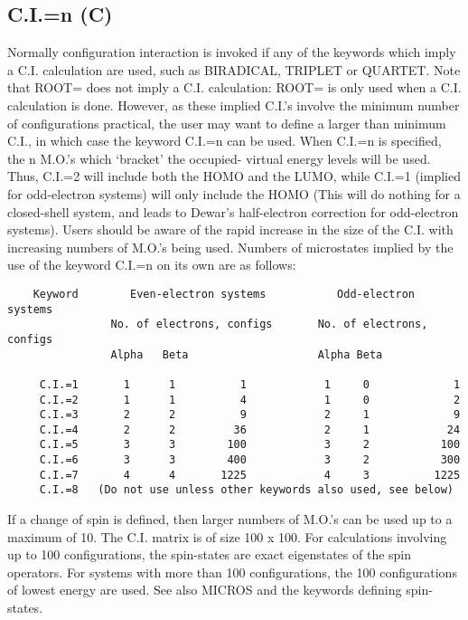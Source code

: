 \documentclass[a4paper]{book}
\newcommand{\mi}[1]{#1\index{#1}}
\begin{document}
\subsection*{C.I.=n (C)}
   Normally configuration interaction is invoked if any of the keywords
   which imply a \mi{C.I.} calculation are used, such as BIRADICAL, TRIPLET or
   QUARTET.  Note that ROOT= does not imply a  C.I. calculation:   ROOT=  is
   only  used  when  a  C.I. calculation is done.  However, as these implied
   C.I.'s involve the minimum number of configurations practical,  the  user
   may  want to define a larger than minimum C.I., in which case the keyword
   C.I.=n can be used.   When  C.I.=n  is  specified,  the  n  M.O.'s  which
   `bracket' the occupied- virtual energy levels will be used.  Thus, C.I.=2
   will include both the HOMO  and  the  LUMO,  while  C.I.=1  (implied  for
   odd-electron  systems)  will  only include the HOMO (This will do nothing
   for a closed-shell system, and leads to Dewar's half-electron  correction
   for  odd-electron  systems).  Users should be aware of the rapid increase
   in the size of the C.I. with increasing numbers  of  M.O.'s  being  used.
   Numbers  of  microstates  implied by the use of the keyword C.I.=n on its
   own are as follows:                    
\begin{verbatim}
    Keyword        Even-electron systems           Odd-electron systems
                No. of electrons, configs       No. of electrons, configs
                Alpha   Beta                    Alpha Beta
    
     C.I.=1       1      1          1            1     0             1
     C.I.=2       1      1          4            1     0             2
     C.I.=3       2      2          9            2     1             9
     C.I.=4       2      2         36            2     1            24
     C.I.=5       3      3        100            3     2           100
     C.I.=6       3      3        400            3     2           300
     C.I.=7       4      4       1225            4     3          1225
     C.I.=8   (Do not use unless other keywords also used, see below)
\end{verbatim}
    
    If a change of spin is defined, then larger numbers of M.O.'s can be
used  up  to a maximum of 10.  The C.I. matrix is of size 100 x 100.  For
calculations involving up to  100  configurations,  the  spin-states  are
exact  eigenstates of the spin operators.  For systems with more than 100
configurations, the 100 configurations of lowest energy  are  used.   See
also MICROS and the keywords defining spin-states.
\end{document}
